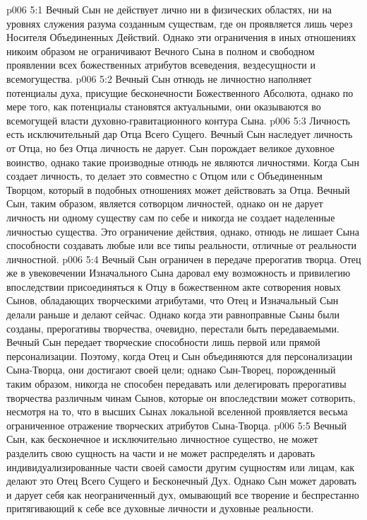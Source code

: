 \vs p006 5:1 Вечный Сын не действует лично ни в физических областях, ни на уровнях служения разума созданным существам, где он проявляется лишь через Носителя Объединенных Действий. Однако эти ограничения в иных отношениях никоим образом не ограничивают Вечного Сына в полном и свободном проявлении всех божественных атрибутов  всеведения, вездесущности и всемогущества.
\vs p006 5:2 Вечный Сын отнюдь не личностно наполняет потенциалы духа, присущие бесконечности Божественного Абсолюта, однако по мере того, как потенциалы становятся актуальными, они оказываются во всемогущей власти духовно\hyp{}гравитационного контура Сына.
\vs p006 5:3 Личность есть исключительный дар Отца Всего Сущего. Вечный Сын наследует личность от Отца, но без Отца личность не дарует. Сын порождает великое духовное воинство, однако такие производные отнюдь не являются личностями. Когда Сын создает личность, то делает это совместно с Отцом или с Объединенным Творцом, который в подобных отношениях может действовать за Отца. Вечный Сын, таким образом, является сотворцом личностей, однако он не дарует личность ни одному существу сам по себе и никогда не создает наделенные личностью существа. Это ограничение действия, однако, отнюдь не лишает Сына способности создавать любые или все типы реальности, отличные от реальности личностной.
\vs p006 5:4 Вечный Сын ограничен в передаче прерогатив творца. Отец же в увековечении Изначального Сына даровал ему возможность и привилегию впоследствии присоединяться к Отцу в божественном акте сотворения новых Сынов, обладающих творческими атрибутами, что Отец и Изначальный Сын делали раньше и делают сейчас. Однако когда эти равноправные Сыны были созданы, прерогативы творчества, очевидно, перестали быть передаваемыми. Вечный Сын передает творческие способности лишь первой или прямой персонализации. Поэтому, когда Отец и Сын объединяются для персонализации Сына\hyp{}Творца, они достигают своей цели; однако Сын\hyp{}Творец, порожденный таким образом, никогда не способен передавать или делегировать прерогативы творчества различным чинам Сынов, которые он впоследствии может сотворить, несмотря на то, что в высших Сынах локальной вселенной проявляется весьма ограниченное отражение творческих атрибутов Сына\hyp{}Творца.
\vs p006 5:5 Вечный Сын, как бесконечное и исключительно личностное существо, не может разделить свою сущность на части и не может распределять и даровать индивидуализированные части своей самости другим сущностям или лицам, как делают это Отец Всего Сущего и Бесконечный Дух. Однако Сын может даровать и дарует себя как неограниченный дух, омывающий все творение и беспрестанно притягивающий к себе все духовные личности и духовные реальности.
